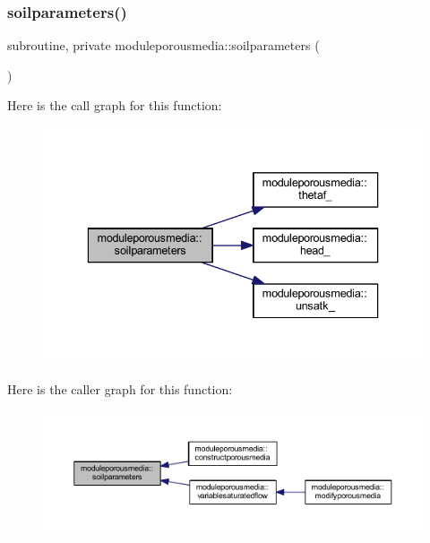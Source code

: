 \subsubsection{\texorpdfstring{soilparameters()}{soilparameters()}}
{\footnotesize\ttfamily subroutine, private moduleporousmedia\+::soilparameters (\begin{DoxyParamCaption}{ }\end{DoxyParamCaption})\hspace{0.3cm}{\ttfamily [private]}}

Here is the call graph for this function\+:\nopagebreak
\begin{figure}[H]
\begin{center}
\leavevmode
\includegraphics[width=336pt]{namespacemoduleporousmedia_ac37dcb693dc313ce78306c5294823662_cgraph}
\end{center}
\end{figure}
Here is the caller graph for this function\+:\nopagebreak
\begin{figure}[H]
\begin{center}
\leavevmode
\includegraphics[width=350pt]{namespacemoduleporousmedia_ac37dcb693dc313ce78306c5294823662_icgraph}
\end{center}
\end{figure}
\mbox{\label{namespacemoduleporousmedia_ad749502c076b86d6579522e1a1377e65}} 
